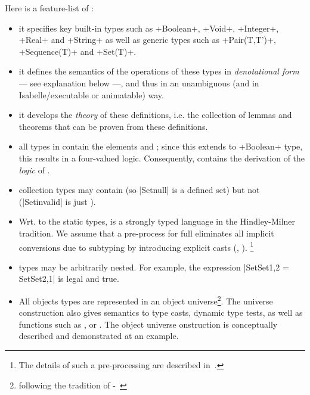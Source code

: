 Here is a feature-list of  \FOCL: 
\begin{itemize}
 \item it specifies key built-in types such as \inlineocl+Boolean+, 
         \inlineocl+Void+, \inlineocl+Integer+, \inlineocl+Real+ and \inlineocl+String+
         as well as generic types such as \inlineocl+Pair(T,T')+, \inlineocl+Sequence(T)+ and \inlineocl+Set(T)+.
 \item it defines the semantics of the operations of these types in \emph{denotational form} 
         --- see explanation below ---, 
         and thus in an unambiguous (and in Isabelle/\HOL executable or animatable) way.    
 \item it develops the \emph{theory} of these definitions, i.e. the collection of lemmas and theorems that
         can be proven from these definitions. 
 \item all types in  \FOCL contain the elements  and ;        
         since this extends to \inlineocl+Boolean+ type, this results 
         in a four-valued logic. Consequently,  \FOCL contains
         the derivation of the \emph{logic} of \OCL.
 \item collection types may contain
          (so \inlineocl|Set{null}| is a defined set) but not
          (\inlineocl|Set{invalid}| is just
         ).
 \item Wrt. to the static types,  \FOCL is a strongly typed language in 
         the Hindley-Milner tradition.
         We assume that a pre-process for full \OCL eliminates all implicit 
         conversions due to subtyping by introducing explicit casts (\eg,
         ). \footnote{The details of such a pre-processing are
         described in~\cite{brucker:interactive:2007}.}                                                                                      
 \item  \FOCL types may be arbitrarily nested. For example,
         the expression
         \inlineocl|Set{Set{1,2}} = Set{Set{2,1}}| is legal and true.
 \item All objects types are represented in an object universe\footnote{following
         the tradition of \HOL-\OCL~\cite{brucker.ea:extensible:2008-b}}.
         The universe construction also gives semantics to type casts, dynamic type
         tests, as well as functions such as ,
         or . The object universe onstruction is
         conceptually described and demonstrated at an example.

\end{itemize}
